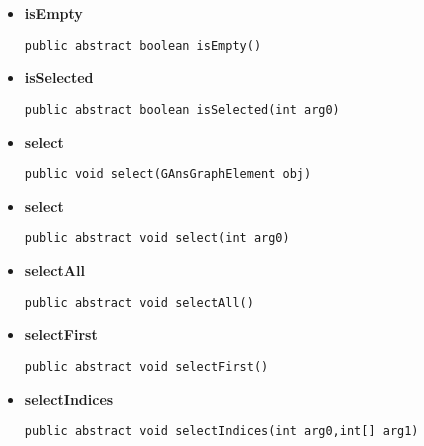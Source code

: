 {{{{{{{{{{\begin{itemize}
{\begin{itemize}
{Returns the \texttt{\small GAnsProperty}{\small 
{}} of all selected items.
}
\item{{\bf  Returns} -- 
A list with all the \texttt{\small GAnsProperty}{\small 
{}} of all selected items. 
}%
\end{itemize}
}%
\item{ 
{\bf  isEmpty}\\
\begin{lstlisting}[frame=none]
public abstract boolean isEmpty()\end{lstlisting} %
}%
\item{ 
{\bf  isSelected}\\
\begin{lstlisting}[frame=none]
public abstract boolean isSelected(int arg0)\end{lstlisting} %
}%
\item{ 
{\bf  select}\\
\begin{lstlisting}[frame=none]
public void select(GAnsGraphElement obj)\end{lstlisting} %
}%
\item{ 
{\bf  select}\\
\begin{lstlisting}[frame=none]
public abstract void select(int arg0)\end{lstlisting} %
}%
\item{ 
{\bf  selectAll}\\
\begin{lstlisting}[frame=none]
public abstract void selectAll()\end{lstlisting} %
}%
\item{ 
{\bf  selectFirst}\\
\begin{lstlisting}[frame=none]
public abstract void selectFirst()\end{lstlisting} %
}%
\item{ 
{\bf  selectIndices}\\
\begin{lstlisting}[frame=none]
public abstract void selectIndices(int arg0,int[] arg1)\end{lstlisting} %
}
\end{itemize}}}}}}}}}}}
